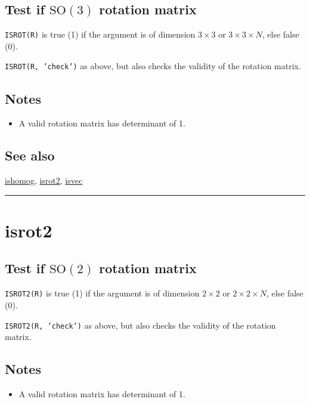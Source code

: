 \subsection*{Test if $\mbox{SO}(3)$ rotation matrix}


\texttt{ISROT(R)} is true (1) if the argument is of dimension $3 \times 3$ or $3 \times 3 \times N$, else false (0).



\texttt{ISROT(R, 'check')} as above, but also checks the validity of the rotation
matrix.


\subsection*{Notes}
\begin{itemize}
  \item A valid rotation matrix has determinant of 1.
\end{itemize}

\subsection*{See also}


\hyperlink{ishomog}{\color{blue} ishomog}, \hyperlink{isrot2}{\color{blue} isrot2}, \hyperlink{isvec}{\color{blue} isvec}

\vspace{1.5ex}\rule{\textwidth}{1mm}

\hypertarget{isrot2}{\section*{isrot2}}
\subsection*{Test if $\mbox{SO}(2)$ rotation matrix}


\texttt{ISROT2(R)} is true (1) if the argument is of dimension $2 \times 2$ or $2 \times 2 \times N$, else false (0).



\texttt{ISROT2(R, 'check')} as above, but also checks the validity of the rotation
matrix.


\subsection*{Notes}
\begin{itemize}
  \item A valid rotation matrix has determinant of 1.
\end{itemize}

